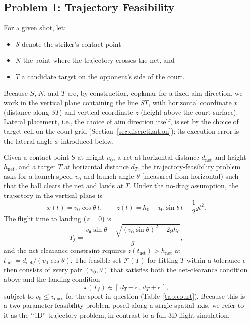   \subsection{Problem 1: Trajectory Feasibility}\label{sec:trajectory}

  For a given shot, let:

  \begin{itemize}
    \item $S$ denote the striker's contact point
    \item $N$ the point where the trajectory crosses the net, and
    \item $T$ a candidate target on the opponent's side of the court.
  \end{itemize}

  Because $S$, $N$, and $T$ are, by construction, coplanar for a fixed aim
  direction, we work in the vertical plane containing the line $ST$, with
  horizontal coordinate $x$ (distance along $ST$) and vertical coordinate $z$
  (height above the court surface). Lateral placement, i.e., the choice of aim
  direction itself, is set by the choice of target cell on the court grid
  (Section~\ref{sec:discretization}); its execution error is the lateral angle
  $\phi$ introduced below.

  Given a contact point $S$ at height $h_0$, a net at horizontal distance
  $d_{\mathrm{net}}$ and height $h_{\mathrm{net}}$, and a target $T$ at
  horizontal distance $d_T$, the trajectory-feasibility problem asks for a
  launch speed $v_0$ and launch angle $\theta$ (measured from horizontal) such
  that the ball clears the net and lands at $T$. Under the no-drag assumption,
  the trajectory in the vertical plane is
  \begin{equation}
  x(t) = v_0 \cos\theta \, t, \qquad
  z(t) = h_0 + v_0 \sin\theta \, t - \frac{1}{2} g t^2 .
  \end{equation}
  The flight time to landing ($z = 0$) is
  \begin{equation}
  T_f = \frac{v_0 \sin\theta + \sqrt{(v_0 \sin\theta)^2 + 2 g h_0}}{g} ,
  \end{equation}
  and the net-clearance constraint requires $z(t_{\mathrm{net}}) >
  h_{\mathrm{net}}$ at $t_{\mathrm{net}} = d_{\mathrm{net}} / (v_0
  \cos\theta)$. The feasible set $\mathcal{F}(T)$ for hitting $T$ within a
  tolerance $\epsilon$ then consists of every pair $(v_0, \theta)$ that
  satisfies both the net-clearance condition above and the landing condition
  \begin{equation}
  x(T_f) \in [\, d_T - \epsilon, \; d_T + \epsilon \,] ,
  \end{equation}
  subject to $v_0 \le v_{\max}$ for the sport in question
  (Table~\ref{tab:court}). Because this is a two-parameter feasibility problem
  posed along a single spatial axis, we refer to it as the ``1D'' trajectory
  problem, in contrast to a full 3D flight simulation.

